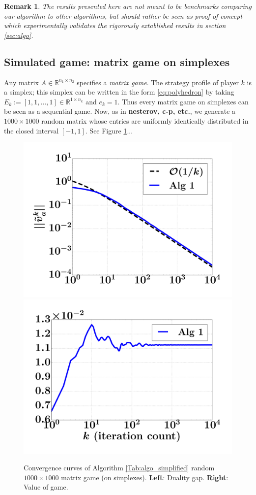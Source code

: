 \documentclass[12pt]{article}
\newtheorem{remark}{Remark}
\begin{document}
\begin{remark}
The results presented here are not meant to be benchmarks comparing our algorithm to other algorithms, but should rather be seen as proof-of-concept which experimentally  validates the rigorously extablished results in section \ref{sec:algo}.

\end{remark}

\subsection{Simulated game: matrix game on simplexes}
Any matrix $A \in \mathbb{R}^{n_1 \times n_2}$ specifies a \textit{matrix game}. The strategy profile of player $k$ is a simplex; this simplex can be written in the form \eqref{eq:polyhedron} by taking $E_k := [1, 1, ..., 1] \in \mathbb{R}^{1 \times n_k}$ and $e_k = 1$. Thus every matrix game on simplexes can be seen as a sequential game. Now, as in \textbf{nesterov, c-p, etc.}, we generate a $1000 \times 1000$ random matrix whose entries are uniformly identically distributed in the closed interval $[-1, 1]$.
See Figure \ref{Tab:sim_dgap_curve}...

\begin{figure}
  \includegraphics[width=.56\linewidth]{simplex_dgap.pdf}
  \includegraphics[width=.56\linewidth]{simplex_NE.pdf}
  \caption{Convergence curves of Algorithm \ref{Tab:algo_simplified} random $1000 \times 1000$ matrix game (on simplexes).
  \textbf{Left}: Duality gap. \textbf{Right}: Value of game.}
  \label{Tab:sim_dgap_curve}
\end{figure}
\end{document}
